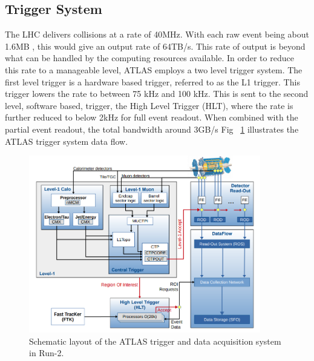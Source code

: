 \subsection{Trigger System}
The LHC delivers collisions at a rate of 40MHz. With each raw event being about 1.6MB \cite{Outreach:1457044}, this would give an output rate of 64TB/s. This rate of output is beyond what can be handled by the computing resources available. In order to reduce this rate to a manageable level, ATLAS employs a two level trigger system. The first level trigger is a hardware based trigger, referred to as the L1 trigger. This trigger lowers the rate to between 75 kHz and 100 kHz. This is sent to the second level, software based, trigger, the High Level Trigger (HLT), where the rate is further reduced to below 2kHz for full event readout. When combined with the partial event readout, the total bandwidth around 3GB/s Fig ~\ref{fig:TDAQ} illustrates the ATLAS trigger system data flow.\newline

\begin{figure}[h]
\begin{center}
\includegraphics*[width=0.90\textwidth] {figures/run2TDAQ}%
\caption[Schematic layout of the ATLAS TDAQ system in Run-2.]{Schematic layout of the ATLAS trigger and data acquisition system in Run-2.\cite{Ruiz-Martinez:2133909}}
\label{fig:TDAQ}
\end{center}
\end{figure}

